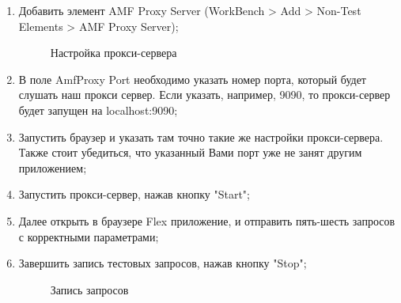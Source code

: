 \begin{enumerate}
\item Добавить элемент AMF Proxy Server (WorkBench > Add > Non-Test Elements > AMF Proxy Server);

\begin{figure}[ht]
\caption{Настройка прокси-сервера}
\label{ris:proxySettings.png}
\end{figure}

\item В поле AmfProxy Port необходимо указать номер порта, который будет слушать наш прокси сервер.
Если указать, например, 9090, то прокси-сервер будет запущен на localhost:9090;
\item Запустить браузер и указать там точно такие же настройки прокси-сервера.
Также стоит убедиться, что указанный Вами порт уже не занят другим приложением;
\item Запустить прокси-сервер, нажав кнопку "Start";
\item Далее открыть в браузере Flex приложение, и отправить пять-шесть запросов с корректными параметрами;
\item Завершить запись тестовых запросов, нажав кнопку "Stop";

\begin{figure}[ht]
\caption{Запись запросов}
\label{ris:proxyRequests.png}
\end{figure}

\end{enumerate}

